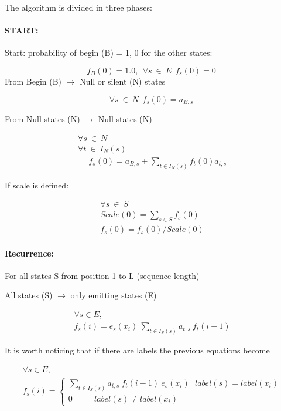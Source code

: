 \documentclass[11pt,english]{article}
\begin{document}
The algorithm is divided in three phases:

\paragraph{START:}

Start: probability of begin (B) = 1,  0 for the other states:

\[
f_{B}(0)=1.0,\: \: \forall s\: \in \: E\: \: f_{s}(0)=0\: \]
 From Begin (B) \( \rightarrow  \) Null or silent (N) states

\[
\forall s\: \in \: N\: \: f_{s}(0)=a_{B,s}\: \]


From Null states (N) \( \rightarrow  \) Null states (N)

\[
\begin{array}{c}
\forall s\: \in \: N\: \: \: \: \: \: \: \: \: \: \: \: \: \: \: \\
\forall t\: \in \: I_{N}(s)\: \: \\
\: \: \: \: \: \: f_{s}(0)=a_{B,s}+\sum _{t\in I_{N}(s)}f_{t}(0)a_{t,s}
\end{array}\]


If scale is defined:

\[
\begin{array}{c}
\forall s\: \in \: S\: \: \: \: \: \: \: \: \: \: \: \: \: \: \: \\
Scale(0)=\sum _{s\in S}f_{s}(0)\\
f_{s}(0)=f_{s}(0)/Scale(0)
\end{array}\]



\paragraph{Recurrence:}

For all states S from position 1 to L (sequence length)

All states (S) \( \rightarrow  \) only emitting states (E)

\[
\begin{array}{c}
\forall s\in E,\\
f_{s}(i)=e_{s}(x_{i})\: \sum _{t\in I_{S}(s)}a_{t,s}\: f_{t}(i-1)
\end{array}\]

It is worth noticing that if there are labels the previous equations 
become

\[
\begin{array}{c}
\forall s\in E,\\
f_{s}(i)=\left\{ \begin{array}{c}
\sum _{t\in I_{S}(s)}a_{t,s}\: f_{t}(i-1)\: e_{s}(x_{i})\: \: \: label(s)=label(x_{i})\\
0\: \: \: \: \: \: \: \: \: \: \: \: label(s)\neq label(x_{i})
\end{array}\right. 
\end{array}\]
\end{document}
